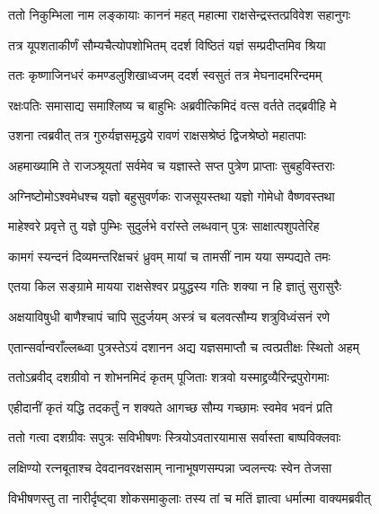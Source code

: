 \twolineshloka
{ततो निकुम्भिला नाम लङ्कायाः काननं महत्}
{महात्मा राक्षसेन्द्रस्तत्प्रविवेश सहानुगः} %

\twolineshloka
{तत्र यूपशताकीर्णं सौम्यचैत्योपशोभितम्}
{ददर्श विष्ठितं यज्ञं सम्प्रदीप्तमिव श्रिया} %

\twolineshloka
{ततः कृष्णाजिनधरं कमण्डलुशिखाध्वजम्}
{ददर्श स्वसुतं तत्र मेघनादमरिन्दमम्} %

\twolineshloka
{रक्षःपतिः समासाद्य समाश्लिष्य च बाहुभिः}
{अब्रवीत्किमिदं वत्स वर्तते तद्ब्रवीहि मे} %

\twolineshloka
{उशना त्वब्रवीत् तत्र गुरुर्यज्ञसमृद्धये}
{रावणं राक्षसश्रेष्ठं द्विजश्रेष्ठो महातपाः} %

\twolineshloka
{अहमाख्यामि ते राजञ्श्रूयतां सर्वमेव च}
{यज्ञास्ते सप्त पुत्रेण प्राप्ताः सुबहुविस्तराः} %

\twolineshloka
{अग्निष्टोमोऽश्वमेधश्च यज्ञो बहुसुवर्णकः}
{राजसूयस्तथा यज्ञो गोमेधो वैष्णवस्तथा} %

\twolineshloka
{माहेश्वरे प्रवृत्ते तु यज्ञे पुम्भिः सुदुर्लभे}
{वरांस्ते लब्धवान् पुत्रः साक्षात्पशुपतेरिह} %

\twolineshloka
{कामगं स्यन्दनं दिव्यमन्तरिक्षचरं ध्रुवम्}
{मायां च तामसीं नाम यया सम्पद्यते तमः} %

\twolineshloka
{एतया किल सङ्ग्रामे मायया राक्षसेश्वर}
{प्रयुद्धस्य गतिः शक्या न हि ज्ञातुं सुरासुरैः} %

\twolineshloka
{अक्षयाविषुधी बाणैश्चापं चापि सुदुर्जयम्}
{अस्त्रं च बलवत्सौम्य शत्रुविध्वंसनं रणे} %

\twolineshloka
{एतान्सर्वान्वराँल्लब्ध्वा पुत्रस्तेऽयं दशानन}
{अद्य यज्ञसमाप्तौ च त्वत्प्रतीक्षः स्थितो अहम्} %

\twolineshloka
{ततोऽब्रवीद् दशग्रीवो न शोभनमिदं कृतम्}
{पूजिताः शत्रवो यस्माद्द्रव्यैरिन्द्रपुरोगमाः} %

\twolineshloka
{एहीदानीं कृतं यद्धि तदकर्तुं न शक्यते}
{आगच्छ सौम्य गच्छामः स्वमेव भवनं प्रति} %

\twolineshloka
{ततो गत्वा दशग्रीवः सपुत्रः सविभीषणः}
{स्त्रियोऽवतारयामास सर्वास्ता बाष्पविक्लवाः} %

\twolineshloka
{लक्षिण्यो रत्नबूताश्च देवदानवरक्षसाम्}
{नानाभूषणसम्पन्ना ज्वलन्त्यः स्वेन तेजसा} %

\twolineshloka
{विभीषणस्तु ता नारीर्दृष्ट्वा शोकसमाकुलाः}
{तस्य तां च मतिं ज्ञात्वा धर्मात्मा वाक्यमब्रवीत्} %

